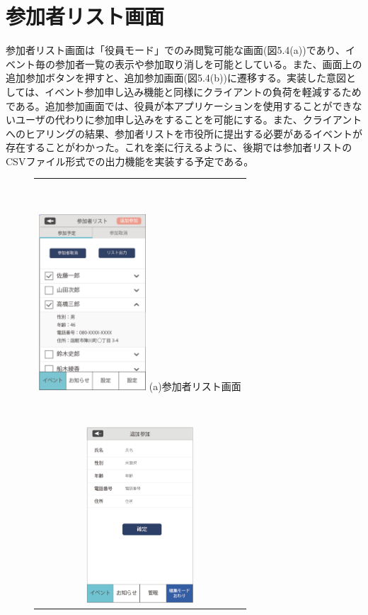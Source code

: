 \section{参加者リスト画面}%
参加者リスト画面は「役員モード」でのみ閲覧可能な画面(図5.4(a))であり、イベント毎の参加者一覧の表示や参加取り消しを可能としている。また、画面上の追加参加ボタンを押すと、追加参加画面(図5.4(b))に遷移する。実装した意図としては、イベント参加申し込み機能と同様にクライアントの負荷を軽減するためである。追加参加画面では、役員が本アプリケーションを使用することができないユーザの代わりに参加申し込みをすることを可能にする。また、クライアントへのヒアリングの結果、参加者リストを市役所に提出する必要があるイベントが存在することがわかった。これを楽に行えるように、後期では参加者リストのCSVファイル形式での出力機能を実装する予定である。
​
\begin{figure}[htbp]
  \begin{center}
    \begin{tabular}{c}
​
      \begin{minipage}{0.33\hsize}
        \begin{center}
\includegraphics[width=4cm]{participant_list}
          \hspace{1cm} %
          {\footnotesize (a)参加者リスト画面}
        \end{center}
      \end{minipage}
​
      \begin{minipage}{0.33\hsize}
        \begin{center}
\includegraphics[width=4cm]{participant_add.png}

\end{center}
\end{minipage}
\end{tabular}
\end{center}
\end{figure}
